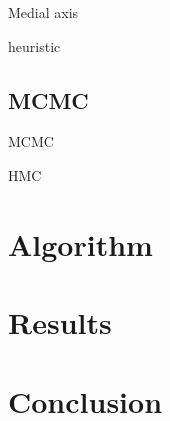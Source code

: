 \documentclass[letterpaper, 10 pt, conference]{ieeeconf}  %
\begin{document}
Medial axis~\cite{LTA03, YDLTA14}

heuristic~\cite{US03, SWT09}

\subsection{MCMC}

MCMC~\cite{ADDJ03}

HMC~\cite{N11}

\section{Algorithm}


\section{Results}


\section{Conclusion}








%
\end{document}
